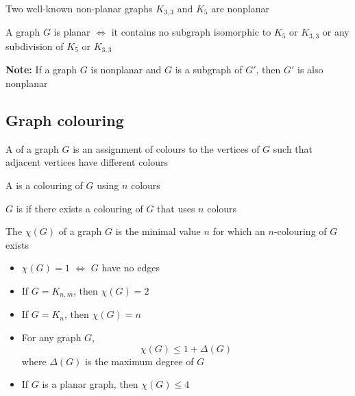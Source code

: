 \documentclass[aspectratio=169]{beamer}\usepackage[]{graphicx}\usepackage[]{xcolor}
\begin{document}
\begin{frame}{Two well-known non-planar graphs}
$K_{3,3}$ and $K_5$ are nonplanar
\vfill
\begin{theorem}
A graph $G$ is planar $\iff$ it contains no subgraph isomorphic to $K_5$ or $K_{3,3}$ or any subdivision of $K_5$ or $K_{3,3}$
\end{theorem}
\vfill
\textbf{Note:} If a graph $G$ is nonplanar and $G$ is a subgraph of $G'$, then $G'$ is also nonplanar
\end{frame}


\subsection{Graph colouring}

\begin{frame}
\begin{definition}
A  of a graph $G$ is an assignment of colours to the vertices of $G$ such that adjacent vertices have different colours
\end{definition}
\vfill
\begin{definition}[{$n$-colouring of $G$}]
A  is a colouring of $G$ using $n$ colours
\end{definition}
\vfill
\begin{definition}[{$n$-colourable}]
$G$ is  if there exists a colouring of $G$ that uses $n$ colours
\end{definition}
\end{frame}


\begin{frame}
\begin{definition}
The  $\chi (G)$ of a graph $G$ is the minimal value $n$ for which an $n$-colouring of $G$ exists
\end{definition}
\vfill
\begin{property}
\begin{itemize}
\item $\chi (G)=1$ $\iff$ $G$ have no edges
\item If $G=K_{n,m}$, then $\chi(G)=2$
\item If $G=K_n$, then $\chi(G)=n$
\item For any graph $G$, $$\chi (G)\leq 1+ \Delta (G)$$
where $\Delta (G)$ is the maximum degree of $G$
\item If $G$ is a planar graph, then $\chi(G) \leq 4$
\end{itemize}
\end{property}
\end{frame}
\end{document}

